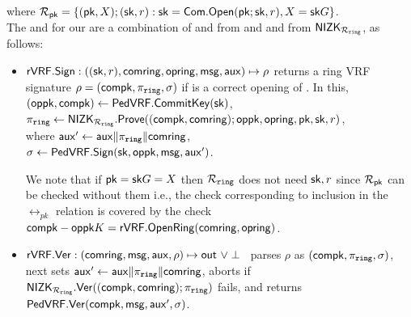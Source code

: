 where $\mathcal{R}_{\mathsf{pk}} = \{(\mathsf{pk}, X);(\mathsf{sk},r): \mathsf{sk} = \mathsf{Com}.\mathsf{Open}(\mathsf{pk};\mathsf{sk},r), X = \mathsf{sk}G\}$. \\

\noindent The \Sign and \Verify for  our \rVRF are a combination of \Sign and \Verify from \PedVRF and
\Prove and \Verify from ${\mathsf{NIZK}}_{\mathcal{R}_{\mathtt{ring}}}$, as follows:
\def\tmpaux{\aux \doubleplus \piring \doubleplus \comring}
\def\tmpeprintaux{\eprint{\aux'}{\tmpaux}}
\def\tmpindent{\hspace*{5pt}}
\begin{itemize}
	\item ${\mathsf{rVRF}}.{\mathsf{Sign}} : ((\mathsf{sk},r),\mathsf{comring}, \mathsf{opring},\mathsf{msg},\mathsf{aux}) \mapsto \rho$
	returns a ring VRF signature $\rho = (\mathsf{compk},\pi_{\mathtt{ring}},\sigma)$
	if \openring is a correct opening of \comring.  In this, 
	\tmpindent $(\mathsf{oppk},\mathsf{compk}) \leftarrow {\ensuremath{\mathsf{PedVRF}}}.{\mathsf{CommitKey}}(\mathsf{sk})$,  \\
	\tmpindent $\pi_{\mathtt{ring}} \leftarrow {\ensuremath{\mathsf{NIZK}}}_{\mathcal{R}_{\mathtt{ring}}}.{\mathsf{Prove}}((\mathsf{compk},\mathsf{comring}); \mathsf{oppk},\mathsf{opring}, \mathsf{pk},\mathsf{sk},r)$, \\
	where 
	\tmpindent $\aux' \leftarrow \tmpaux$,  \\
	\tmpindent $\sigma \leftarrow {\ensuremath{\mathsf{PedVRF}}}.{\mathsf{Sign}}(\mathsf{sk},\mathsf{oppk},\mathsf{msg}, \mathsf{aux}')$.
		
	We note that if $ \mathsf{pk} = \mathsf{sk}G = X $ then $ \mathcal{R}_{\mathtt{ring}} $ does not need $ \mathsf{sk},r $ since $ \mathcal{R}_{\mathsf{pk}} $ can be checked without them i.e., the check corresponding to inclusion in the $\rel_{pk}$ relation 
	is covered by the check $ \mathsf{compk} - \mathsf{oppk} K = {\mathsf{rVRF}}.{\mathsf{OpenRing}}(\mathsf{comring},\mathsf{opring}) $.
	\item ${\mathsf{rVRF}}.{\mathsf{Ver}} : (\mathsf{comring},\mathsf{msg},\mathsf{aux},\rho) \mapsto {\ensuremath{\mathsf{out}}} \,\, \lor \perp$ \,
	parses $\rho$ as $(\mathsf{compk},\pi_{\mathtt{ring}},\sigma)$, next sets $\aux' \leftarrow \tmpaux$,
	aborts if ${\mathsf{NIZK}}_{\mathcal{R}_{\mathtt{ring}}}.{\mathsf{Ver}}((\mathsf{compk},\mathsf{comring}); \pi_{\mathtt{ring}})$ fails,
	and returns ${\mathsf{PedVRF}}.{\mathsf{Ver}}(\mathsf{compk},\mathsf{msg}, \mathsf{aux}', \sigma)$.
\end{itemize}




